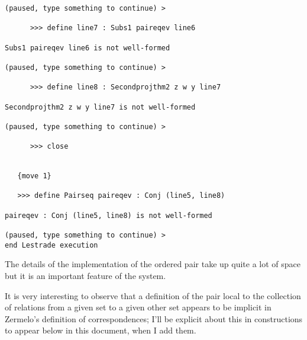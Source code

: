 \documentclass[12pt]{article}
\begin{document}
\begin{verbatim}
(paused, type something to continue) >

      >>> define line7 : Subs1 paireqev line6

Subs1 paireqev line6 is not well-formed

(paused, type something to continue) >

      >>> define line8 : Secondprojthm2 z w y line7

Secondprojthm2 z w y line7 is not well-formed

(paused, type something to continue) >

      >>> close


   {move 1}

   >>> define Pairseq paireqev : Conj (line5, line8)

paireqev : Conj (line5, line8) is not well-formed

(paused, type something to continue) >
end Lestrade execution
\end{verbatim}

The details of the implementation of the ordered pair take up quite a lot of space but it is an important feature of the system.

It is very interesting to observe that a definition of the pair local to the collection of relations from a given set to a given other set appears to be implicit in Zermelo's definition of correspondences;  I'll be explicit about this in constructions to appear below in this document, when I add them.
\end{document}
